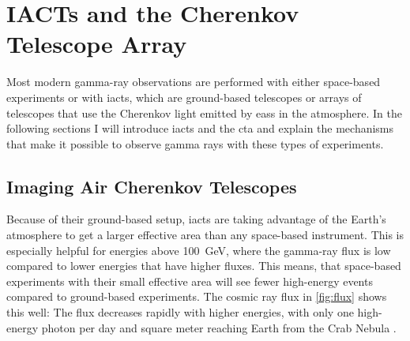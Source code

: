 \chapter{IACTs and the Cherenkov Telescope Array}

Most modern gamma-ray observations are performed with either space-based experiments or with
\glspl{iact}, which are ground-based telescopes or arrays of telescopes that use the Cherenkov light
emitted by \glspl{eas} in the atmosphere. In the following sections I will introduce \glspl{iact} and
the \gls{cta} and explain the mechanisms that make it possible to observe gamma rays with these types
of experiments.


\section{Imaging Air Cherenkov Telescopes}

Because of their ground-based setup, \glspl{iact} are taking advantage of the Earth's atmosphere to get a
larger effective area than any space-based instrument. This is especially helpful for energies above
\SI{100}{\giga\eV}, where the gamma-ray flux is low compared to lower energies
that have higher fluxes. This means, that space-based experiments with their small effective area
will see fewer high-energy events compared to ground-based experiments. The cosmic ray flux in
\autoref{fig:flux} shows this well: The flux decreases rapidly with higher energies, with only one
high-energy photon per day and square meter reaching Earth from the Crab Nebula \cite{noethe_thesis}.

%     

